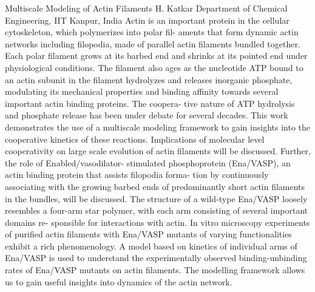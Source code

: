 
    \begin{abstract_online}{Multiscale Modeling of Actin Filaments }{%
        H. Katkar}{%
        \IStag}{%
        Department of Chemical Engineering, IIT Kanpur, India}
    Actin is an important protein in the cellular cytoskeleton, which polymerizes into polar fil- aments that form dynamic actin networks including filopodia, made of parallel actin filaments bundled together. Each polar filament grows at its barbed end and shrinks at its pointed end under physiological conditions. The filament also ages as the nucleotide ATP bound to an actin subunit in the filament hydrolyzes and releases inorganic phosphate, modulating its mechanical properties and binding affinity towards several important actin binding proteins. The coopera- tive nature of ATP hydrolysis and phosphate release has been under debate for several decades. This work demonstrates the use of a multiscale modeling framework to gain insights into the cooperative kinetics of these reactions. Implications of molecular level cooperativity on large scale evolution of actin filaments will be discussed. Further, the role of Enabled/vasodilator- stimulated phosphoprotein (Ena/VASP), an actin binding protein that assists filopodia forma- tion by continuously associating with the growing barbed ends of predominantly short actin filaments in the bundles, will be discussed. The structure of a wild-type Ena/VASP loosely resembles a four-arm star polymer, with each arm consisting of several important domains re- sponsible for interactions with actin. In vitro microscopy experiments of purified actin filaments with Ena/VASP mutants of varying functionalities exhibit a rich phenomenology. A model based on kinetics of individual arms of Ena/VASP is used to understand the experimentally observed binding-unbinding rates of Ena/VASP mutants on actin filaments. The modelling framework allows us to gain useful insights into dynamics of the actin network. 
    
    \end{abstract_online}
    